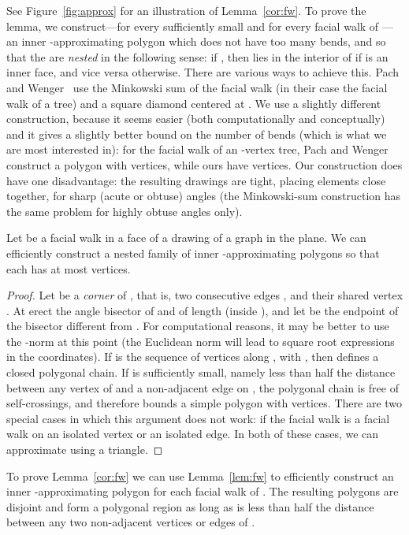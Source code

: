 \documentclass{llncs}
\begin{document}
See Figure~\ref{fig:approx} for an illustration of Lemma~\ref{cor:fw}. To prove the lemma, we construct---for every sufficiently small  and for every facial walk of ---an
inner -approximating polygon
 which
does not have too many bends, and so that the  are
{\em nested}
in the following sense: if , then
 lies in the interior of
 if  is an inner face, and vice versa otherwise.
There are various ways to achieve this. Pach and Wenger~\cite{PW01} use the Minkowski sum of the facial walk (in their case the facial walk of a tree) and a square diamond centered at .  We use a slightly different construction, because it seems easier (both computationally and conceptually) and it gives a slightly better bound on the number of bends (which is what we are most interested in): for the facial walk of an -vertex tree, Pach and Wenger construct a
polygon with  vertices, while ours  have  vertices. Our construction does have one disadvantage: the resulting drawings are tight, placing elements close together, for sharp (acute or obtuse) angles (the Minkowski-sum construction has the same problem for highly obtuse angles only).

\begin{lemma}\label{lem:fw}
 Let  be a facial walk in a face  of a drawing of a graph  in the plane. We can efficiently construct a
 nested family of inner -approximating polygons
 so that
each  has at most  vertices.
\end{lemma}

\begin{proof}
 Let  be a {\em corner} of , that is, two consecutive edges ,  and their shared vertex . At  erect the angle bisector of  and  of length  (inside ), and let  be the endpoint of the bisector different from . For computational reasons, it may be better to use the -norm at this point (the Euclidean norm will lead to square root expressions in the coordinates). If  is the sequence of vertices along , with , then  defines a
 closed polygonal chain.  If  is sufficiently small, namely less than half the distance between any vertex of  and a non-adjacent edge on , the
 polygonal chain
is free of self-crossings, and therefore bounds a simple polygon with  vertices. There are two special cases in which this argument does not work: if the facial walk is a facial walk on an isolated vertex or an isolated edge. In both of these cases, we can approximate  using a
 triangle.
\end{proof}

To prove Lemma~\ref{cor:fw} we can use
Lemma~\ref{lem:fw} to efficiently construct an inner -approximating polygon for
each facial walk of .
The resulting polygons are disjoint and form a polygonal region
as long as  is less than half the distance between any two non-adjacent vertices or edges of .
\end{document}
